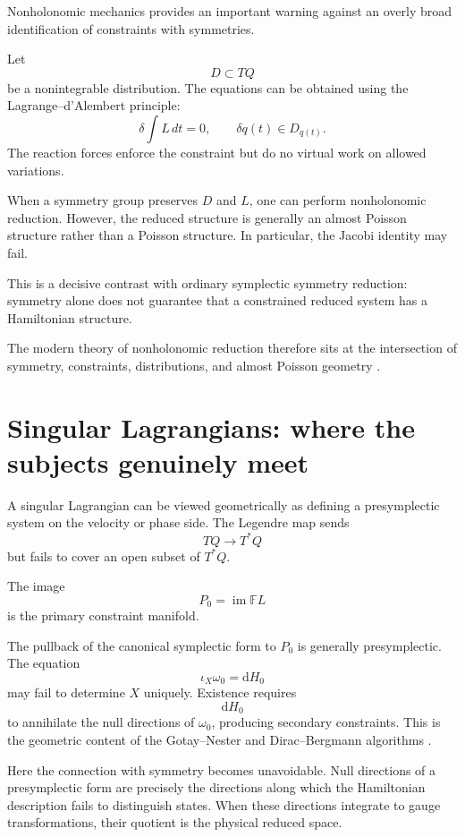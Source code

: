 \documentclass[11pt,a4paper]{article}
\newcommand{\dd}{\mathrm d}
\newcommand{\im}{\operatorname{im}}
\theoremstyle{definition}
\begin{document}
Nonholonomic mechanics provides an important warning against an overly broad
identification of constraints with symmetries.

Let
\[
        D\subset TQ
\]
be a nonintegrable distribution.  The equations can be obtained using the
Lagrange--d'Alembert principle:
\[
        \delta\int L\,dt=0,
        \qquad
        \delta q(t)\in D_{q(t)}.
\]
The reaction forces enforce the constraint but do no virtual work on allowed
variations.

When a symmetry group preserves $D$ and $L$, one can perform nonholonomic
reduction.  However, the reduced structure is generally an almost Poisson
structure rather than a Poisson structure.  In particular, the Jacobi identity
may fail.

This is a decisive contrast with ordinary symplectic symmetry reduction:
symmetry alone does not guarantee that a constrained reduced system has a
Hamiltonian structure.

The modern theory of nonholonomic reduction therefore sits at the
intersection of symmetry, constraints, distributions, and almost Poisson
geometry \cite{CendraMarsdenRatiu2001}.

\section{Singular Lagrangians: where the subjects genuinely meet}

A singular Lagrangian can be viewed geometrically as defining a presymplectic
system on the velocity or phase side.  The Legendre map sends
\[
        TQ\to T^*Q
\]
but fails to cover an open subset of $T^*Q$.

The image
\[
        P_0=\im\mathbb FL
\]
is the primary constraint manifold.

The pullback of the canonical symplectic form to $P_0$ is generally
presymplectic.  The equation
\[
        \iota_X\omega_0=\dd H_0
\]
may fail to determine $X$ uniquely.  Existence requires
\[
        \dd H_0
\]
to annihilate the null directions of $\omega_0$, producing secondary
constraints.  This is the geometric content of the Gotay--Nester and
Dirac--Bergmann algorithms
\cite{GotayNesterHinds1978,GotayNester1979}.

Here the connection with symmetry becomes unavoidable.  Null directions of a
presymplectic form are precisely the directions along which the Hamiltonian
description fails to distinguish states.  When these directions integrate to
gauge transformations, their quotient is the physical reduced space.
\end{document}
